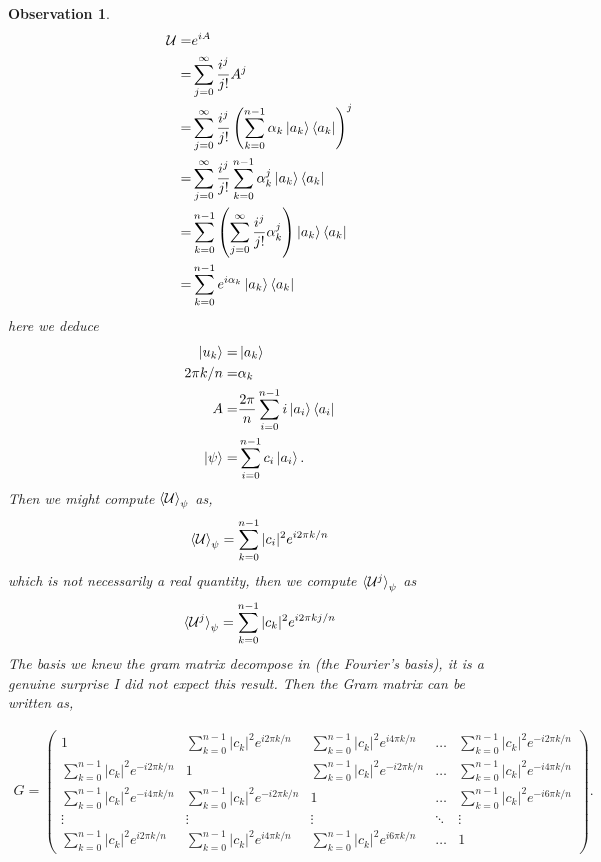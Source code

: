 \documentclass[12pt,letterpaper]{article}
\newtheorem{observation}{Observation}
\begin{document}
\begin{multicols}{2}
\begin{observation}
\begin{align}
\mathcal{U}=&e^{iA}\\
=&\sum_{j=0}^{\infty}\frac{i^j}{j!}A^j\\
=&\sum_{j=0}^{\infty}\frac{i^j}{j!}\left(\sum_{k=0}^{n-1}\alpha_k\ket{a_k}\bra{a_k}\right)^j\\
=&\sum_{j=0}^{\infty}\frac{i^j}{j!}\sum_{k=0}^{n-1}\alpha_k^j\ket{a_k}\bra{a_k}\\
=&\sum_{k=0}^{n-1}\left(\sum_{j=0}^{\infty}\frac{i^j}{j!}\alpha_k^j\right)\ket{a_k}\bra{a_k}\\
=&\sum_{k=0}^{n-1}e^{i\alpha_k}\ket{a_k}\bra{a_k}
\end{align}
here we deduce 
\begin{align}
\ket{u_k}=&\ket{a_k}\\
2\pi k/n =& \alpha_k\\
A=&\frac{2\pi}{n}\sum_{i=0}^{n-1}i \ket{a_i}\bra{a_i}\\
\ket{\psi}=&\sum_{i=0}^{n-1}c_i\ket{a_i}.
\end{align}
Then we might compute $\braket{\mathcal{U}}_\psi$ as,
\begin{align}
\braket{\mathcal{U}}_\psi= \sum_{k=0}^{n-1}|c_i|^2e^{i2\pi k/n}
\end{align}
which is not necessarily a real quantity, then we compute $\braket{\mathcal{U}^j}_\psi$ as
\begin{align}
\braket{\mathcal{U}^j}_\psi= \sum_{k=0}^{n-1}|c_k|^2e^{i2\pi kj/n}
\end{align}
The basis we knew the gram matrix decompose in  (the Fourier's basis), it is a genuine surprise I did not expect this result. Then the Gram matrix can be written as,
\end{observation}
\end{multicols}
\begin{align}
G=\begin{pmatrix}
 1 & \sum_{k=0}^{n-1}|c_k|^2e^{i2\pi k/n} & \sum_{k=0}^{n-1}|c_k|^2e^{i4\pi k/n}  & \hdots &  \sum_{k=0}^{n-1}|c_k|^2e^{-i2\pi k/n} \\
  \sum_{k=0}^{n-1}|c_k|^2e^{-i2\pi k/n} & 1 & \sum_{k=0}^{n-1}|c_k|^2e^{-i2\pi k/n} & \hdots & \sum_{k=0}^{n-1}|c_k|^2e^{-i4\pi k/n} \\
   \sum_{k=0}^{n-1}|c_k|^2e^{-i4\pi k/n} &  \sum_{k=0}^{n-1}|c_k|^2e^{-i2\pi k/n}  & 1 & \hdots & \sum_{k=0}^{n-1}|c_k|^2e^{-i6\pi k/n} \\
   \vdots & \vdots & \vdots & \ddots & \vdots \\
  \sum_{k=0}^{n-1}|c_k|^2e^{i2\pi k/n} &\sum_{k=0}^{n-1}|c_k|^2e^{i4\pi k/n}  & \sum_{k=0}^{n-1}|c_k|^2e^{i6\pi k/n}  & \hdots &  1 
\end{pmatrix}.
\end{align}
\end{document}
